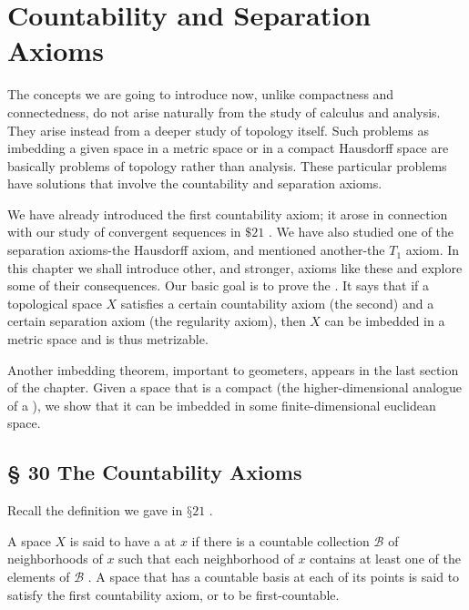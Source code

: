 \chapter{Countability and Separation Axioms}

The concepts we are going to introduce now, unlike compactness and connectedness, do not arise naturally from the study of calculus and analysis. They arise instead from a deeper study of topology itself. Such problems as  imbedding a given space in a metric space or in a compact Hausdorff space are basically problems of topology rather than analysis. These particular problems have solutions that involve the countability and separation axioms.

We have already introduced the first countability axiom; it arose in connection with our study of  convergent sequences in \(\$ {21}\) . We have also studied one of the separation axioms-the Hausdorff axiom, and mentioned another-the \({T}_{1}\) axiom. In this chapter we shall introduce other, and stronger, axioms like these and explore some of their consequences. Our basic goal is to prove the . It says that if a topological space \(X\) satisfies a certain countability axiom (the second) and a certain separation axiom (the  regularity axiom), then \(X\) can be imbedded in a metric space and is thus metrizable.

Another imbedding theorem, important to geometers, appears in the last section of the chapter. Given a space that is a compact  (the higher-dimensional analogue of a ), we show that it can be imbedded in some finite-dimensional euclidean space.

\section*{§ 30 The Countability Axioms}

Recall the definition we gave in \(§{21}\) .

\begin{definition}
	A space \(X\) is said to have a  at \(x\) if there is a countable collection \(\mathcal{B}\) of neighborhoods of \(x\) such that each neighborhood of \(x\) contains at least one of the elements of \(\mathcal{B}\) . A space that has a countable basis at each of its  points is said to satisfy the first countability axiom, or to be first-countable.
\end{definition}

